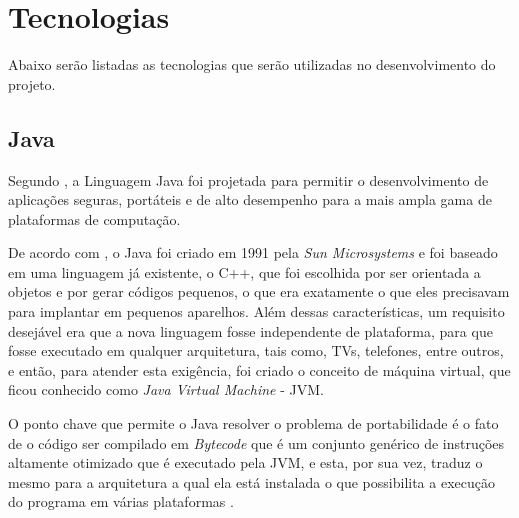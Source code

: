 \section{Tecnologias}

\par Abaixo serão listadas as tecnologias que serão utilizadas no
desenvolvimento do projeto.

\subsection{Java}

\par Segundo , a Linguagem Java foi projetada
para permitir o desenvolvimento de aplicações seguras, portáteis
e de alto desempenho para a mais ampla gama de plataformas de computação.

\par De acordo com , o Java foi
criado em 1991 pela \textit{Sun Microsystems} e foi baseado em uma linguagem já
existente, o C++, que foi escolhida por ser orientada a objetos e
por gerar códigos pequenos, o que era exatamente o que eles precisavam para
implantar em pequenos aparelhos. Além dessas características, um requisito
desejável era que a nova linguagem fosse independente de plataforma, para que
fosse executado em qualquer arquitetura, tais como, TVs, telefones, entre
outros, e então, para atender esta exigência, foi
criado o conceito de máquina virtual, que ficou conhecido como \textit{Java
Virtual Machine} - JVM\footnotemark[2].


\par O ponto chave que
permite o Java resolver o problema de portabilidade é o fato de o código ser
compilado em \textit{Bytecode} que é um conjunto genérico de instruções
altamente otimizado que é executado pela JVM, e esta, por sua vez, traduz o
mesmo para a arquitetura a qual ela está instalada o que possibilita a execução do programa
em várias plataformas \cite{livro_java_complete_references}.


% 
% 
% 


